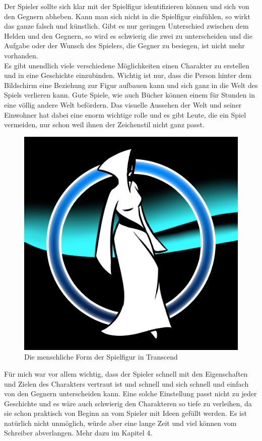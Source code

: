 \documentclass[12pt,a4paper,titlepage]{article}
\begin{document}
		Der Spieler sollte sich klar mit der Spielfigur identifizieren können und sich von den Gegnern abheben. Kann man sich nicht in die Spielfigur einfühlen, so wirkt das ganze falsch und künstlich. Gibt es nur geringen Unterschied zwischen dem Helden und den Gegnern, so wird es schwierig die zwei zu unterscheiden und die Aufgabe oder der Wunsch des Spielers, die Gegner zu besiegen, ist nicht mehr vorhanden.\\
		
		Es gibt unendlich viele verschiedene Möglichkeiten einen Charakter zu erstellen und in eine Geschichte einzubinden. Wichtig ist nur, dass die Person hinter dem Bildschirm eine Beziehung zur Figur aufbauen kann und sich ganz in die Welt des Spiels verlieren kann. Gute Spiele, wie auch Bücher können einem für Stunden in eine völlig andere Welt befördern. Das visuelle Aussehen der Welt und seiner Einwohner hat dabei eine enorm wichtige rolle und es gibt Leute, die ein Spiel vermeiden, nur schon weil ihnen der Zeichenstil nicht ganz passt.\\
		\begin{figure}
  			\centering
			\includegraphics[keepaspectratio=true,scale=0.4]{humanform.png}
  			\caption{Die menschliche Form der Spielfigur in Transcend}
		\end{figure}
		Für mich war vor allem wichtig, dass der Spieler schnell mit den Eigenschaften und Zielen des Charakters vertraut ist und schnell und sich schnell und einfach von den Gegnern unterscheiden kann. Eine solche Einstellung passt nicht zu jeder Geschichte und es wäre auch schwierig den Charakteren so tiefe zu verleihen, da sie schon praktisch von Beginn an vom Spieler mit Ideen gefüllt werden. Es ist natürlich nicht unmöglich, würde aber eine lange Zeit und viel können vom Schreiber abverlangen. Mehr dazu im Kapitel 4.\\
		
\end{document}
